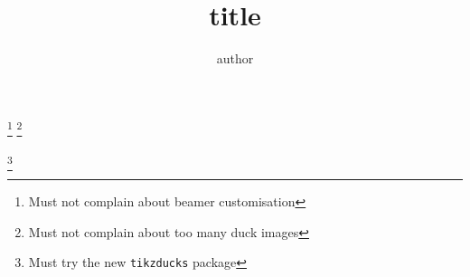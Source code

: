 \documentclass{beamer}
\title{title}
\author{author}
\institute{ins}
\begin{document}
\begin{frame}
    \footnote{Must not complain about beamer customisation}
    \footnote{Must not complain about too many duck images}
\end{frame} 

\begin{frame}
    \footnote{Must try the new \texttt{tikzducks} package}
\end{frame} 
\end{document}
